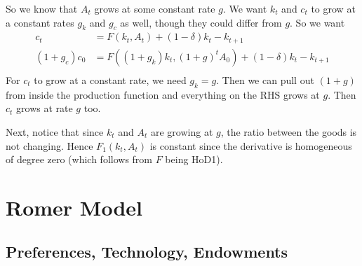 \documentclass[12pt]{article}
\theoremstyle{plain}
\theoremstyle{definition}
\theoremstyle{remark}
\begin{document}
So we know that $A_t$ grows at some constant rate $g$. We want $k_t$ and
$c_t$ to grow at a constant rates $g_k$ and $g_c$ as well, though they
could differ from $g$. So we want
\begin{align*}
  c_t &= F(k_t,A_t) + (1-\delta) k_t - k_{t+1} \\
  (1+g_c) c_0 &= F((1+g_k)k_t,(1+g)^tA_0) + (1-\delta) k_t - k_{t+1} \\
\end{align*}
For $c_t$ to grow at a constant rate, we need $g_k=g$. Then we can pull
out $(1+g)$ from inside the production function and everything on the
RHS grows at $g$. Then $c_t$ grows at rate $g$ too.

Next, notice that since $k_t$ and $A_t$ are growing at $g$, the ratio
between the goods is not changing. Hence $F_1(k_t,A_t)$ is constant
since the derivative is homogeneous of degree zero (which follows from
$F$ being HoD1).


\clearpage
\section{Romer Model}

\subsection{Preferences, Technology, Endowments}
\end{document}
